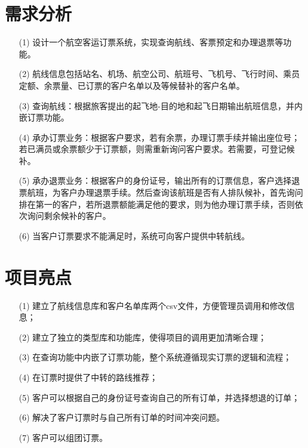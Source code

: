 \documentclass{DateStructure}
\begin{document}
\makecover
\newpage
\thispagestyle{empty}
\tableofcontents   
\newpage
\setcounter{page}{1}  

\section{需求分析}
\begin{itemize}
\item[(1)]设计一个航空客运订票系统，实现查询航线、客票预定和办理退票等功能。
\item[(2)]航线信息包括站名、机场、航空公司、航班号、飞机号、飞行时间、乘员定额、余票量、已订票的客户名单以及等候替补的客户名单。
\item[(3)]查询航线：根据旅客提出的起飞地-目的地和起飞日期输出航班信息，并内嵌订票功能。
\item[(4)]承办订票业务：根据客户要求，若有余票，办理订票手续并输出座位号；若已满员或余票额少于订票额，则需重新询问客户要求。若需要，可登记候补。
\item[(5)]承办退票业务：根据客户的身份证号，输出所有的订票信息，客户选择退票航班，为客户办理退票手续。然后查询该航班是否有人排队候补，首先询问排在第一的客户，若所退票额能满足他的要求，则为他办理订票手续，否则依次询问剩余候补的客户。
\item[(6)]当客户订票要求不能满足时，系统可向客户提供中转航线。
\end{itemize}

\section{项目亮点}
\begin{itemize}
\item[(1)]建立了航线信息库和客户名单库两个csv文件，方便管理员调用和修改信息；
\item[(2)]建立了独立的类型库和功能库，使得项目的调用更加清晰合理；
\item[(3)]在查询功能中内嵌了订票功能，整个系统遵循现实订票的逻辑和流程；
\item[(4)]在订票时提供了中转的路线推荐；
\item[(5)]客户可以根据自己的身份证号查询自己的所有订单，并选择想退的订单；
\item[(6)]解决了客户订票时与自己所有订单的时间冲突问题。
\item[(7)]客户可以组团订票。
\end{itemize}
\end{document}

